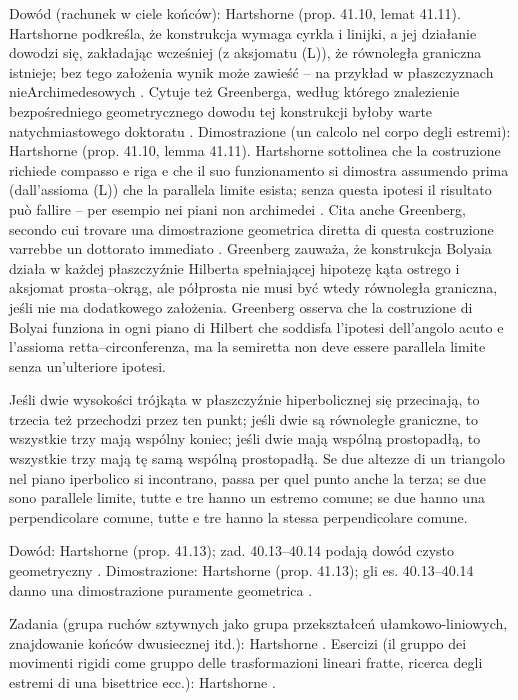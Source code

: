 Dowód (rachunek w ciele końców): Hartshorne \cite[s. 396--398]{hartshorne_2000} (prop. 41.10, lemat 41.11). %
Hartshorne podkreśla, że konstrukcja wymaga cyrkla i linijki, a jej działanie dowodzi się, zakładając wcześniej (z aksjomatu (L)), że równoległa graniczna istnieje; bez tego założenia wynik może zawieść -- na przykład w płaszczyznach nieArchimedesowych \cite[s. 398]{hartshorne_2000}. %
Cytuje też Greenberga, według którego znalezienie bezpośredniego geometrycznego dowodu tej konstrukcji byłoby warte natychmiastowego doktoratu \cite[s. 398]{hartshorne_2000}. %
Dimostrazione (un calcolo nel corpo degli estremi): Hartshorne \cite[p. 396--398]{hartshorne_2000} (prop. 41.10, lemma 41.11). %
Hartshorne sottolinea che la costruzione richiede compasso e riga e che il suo funzionamento si dimostra assumendo prima (dall'assioma (L)) che la parallela limite esista; senza questa ipotesi il risultato può fallire -- per esempio nei piani non archimedei \cite[p. 398]{hartshorne_2000}. %
Cita anche Greenberg, secondo cui trovare una dimostrazione geometrica diretta di questa costruzione varrebbe un dottorato immediato \cite[p. 398]{hartshorne_2000}. %
Greenberg \cite[s. 210]{greenberg_2010} zauważa, że konstrukcja Bolyaia działa w każdej płaszczyźnie Hilberta spełniającej hipotezę kąta ostrego i aksjomat prosta--okrąg, ale półprosta nie musi być wtedy równoległa graniczna, jeśli nie ma dodatkowego założenia. %
Greenberg \cite[p. 210]{greenberg_2010} osserva che la costruzione di Bolyai funziona in ogni piano di Hilbert che soddisfa l'ipotesi dell'angolo acuto e l'assioma retta--circonferenza, ma la semiretta non deve essere parallela limite senza un'ulteriore ipotesi. %

\begin{theorem}
[o wysokościach trójkąta] %
[sulle altezze di un triangolo] %
	Jeśli dwie wysokości trójkąta w płaszczyźnie hiperbolicznej się przecinają, to trzecia też przechodzi przez ten punkt; jeśli dwie są równoległe graniczne, to wszystkie trzy mają wspólny koniec; jeśli dwie mają wspólną prostopadłą, to wszystkie trzy mają tę samą wspólną prostopadłą. %
	Se due altezze di un triangolo nel piano iperbolico si incontrano, passa per quel punto anche la terza; se due sono parallele limite, tutte e tre hanno un estremo comune; se due hanno una perpendicolare comune, tutte e tre hanno la stessa perpendicolare comune. %
\end{theorem}

Dowód: Hartshorne \cite[s. 399--400]{hartshorne_2000} (prop. 41.13); zad. 40.13--40.14 podają dowód czysto geometryczny \cite[s. 387]{hartshorne_2000}. %
Dimostrazione: Hartshorne \cite[p. 399--400]{hartshorne_2000} (prop. 41.13); gli es. 40.13--40.14 danno una dimostrazione puramente geometrica \cite[p. 387]{hartshorne_2000}. %

Zadania (grupa ruchów sztywnych jako grupa przekształceń ułamkowo-liniowych, znajdowanie końców dwusiecznej itd.): Hartshorne \cite[s. 400--402]{hartshorne_2000}. %
Esercizi (il gruppo dei movimenti rigidi come gruppo delle trasformazioni lineari fratte, ricerca degli estremi di una bisettrice ecc.): Hartshorne \cite[p. 400--402]{hartshorne_2000}. %
